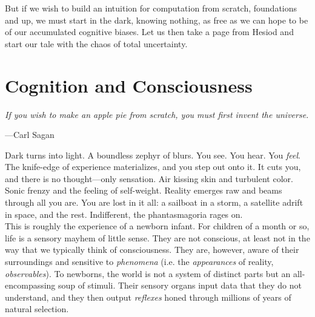 But if we wish to build an intuition for computation from scratch, foundations and up, we must start in the dark, knowing nothing, as free as we can hope to be of our accumulated cognitive biases. Let us then take a page from Hesiod and start our tale with the chaos of total uncertainty. \\


\toclineskip
\section{Cognition and Consciousness}


\vspace{4mm}
\begin{displayquote}
	\textit{If you wish to make an apple pie from scratch, you must first invent the universe.}
	\vspace{2mm}
	\begin{flushright}
		---Carl Sagan
	\end{flushright}
\end{displayquote}
\vspace{4mm}

Dark turns into light. A boundless zephyr of blurs. You see. You hear. You \textit{feel}. The knife-edge of experience materializes, and you step out onto it. It cuts you, and there is no thought---only sensation. Air kissing skin and turbulent color. Sonic frenzy and the feeling of self-weight. Reality emerges raw and beams through all you are. You are lost in it all: a sailboat in a storm, a satellite adrift in space, and the rest. Indifferent, the phantasmagoria rages on. \\

This is roughly the experience of a newborn infant. For children of a month or so, life is a sensory mayhem of little sense. They are not conscious, at least not in the way that we typically think of consciousness. They are, however, aware of their surroundings and sensitive to \textit{phenomena} (i.e. the \textit{appearances} of reality, \textit{observables}). To newborns, the world is not a system of distinct parts but an all-encompassing soup of stimuli. Their sensory organs input data that they do not understand, and they then output \textit{reflexes} honed through millions of years of natural selection. \\


